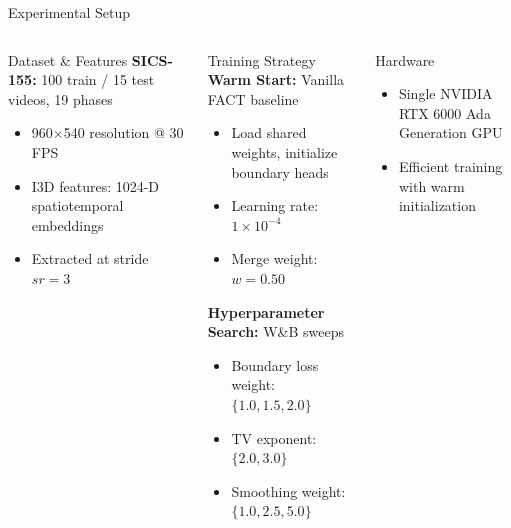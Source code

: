 \documentclass[9pt,aspectratio=169]{beamer}
\newcommand{\factmodel}{\textsc{FACT}\xspace}
\begin{document}
\begin{frame}[label=slide4a]{Experimental Setup}
  \begin{columns}[T,onlytextwidth]
      \begin{block}{Dataset \& Features}
        \textbf{SICS-155:} 100 train / 15 test videos, 19 phases
        \begin{itemize}
          \item 960×540 resolution @ 30 FPS
          \item I3D features: 1024-D spatiotemporal embeddings
          \item Extracted at stride $sr = 3$
        \end{itemize}
      \end{block}
      
      \begin{block}{Training Strategy}
        \textbf{Warm Start:} Vanilla \factmodel baseline
        \begin{itemize}
          \item Load shared weights, initialize boundary heads
          \item Learning rate: $1 \times 10^{-4}$
          \item Merge weight: $w = 0.50$
        \end{itemize}
        
        \textbf{Hyperparameter Search:} W\&B sweeps
        \begin{itemize}
          \item Boundary loss weight: $\{1.0, 1.5, 2.0\}$
          \item TV exponent: $\{2.0, 3.0\}$
          \item Smoothing weight: $\{1.0, 2.5, 5.0\}$
        \end{itemize}
      \end{block}
      
      \begin{block}{Hardware}
        \begin{itemize}
          \item Single NVIDIA RTX 6000 Ada Generation GPU
          \item Efficient training with warm initialization
        \end{itemize}
      \end{block}
  \end{columns}
\end{frame}
\end{document}
